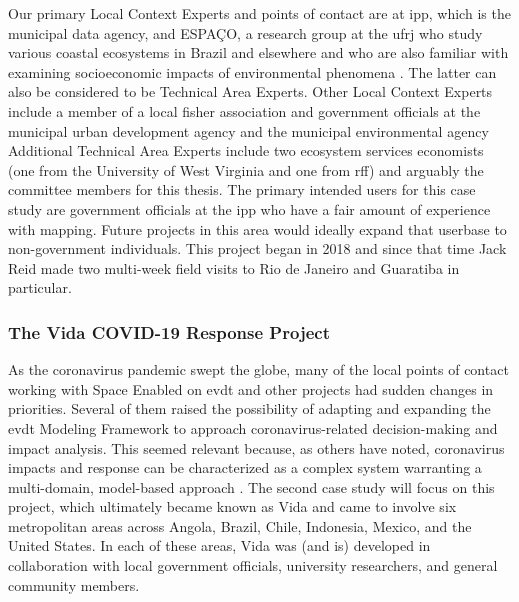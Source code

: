 \documentclass[notitlepage]{article}
\begin{document}
\color{OliveGreen} Our primary Local Context Experts and points of contact are at \ac{ipp}, which is the municipal data agency, and ESPAÇO, a research group at the \ac{ufrj} who study various coastal ecosystems in Brazil and elsewhere \cite{cruzClassificacaoOrientadaObjetos2007, seabraMapeamentoDinamicaCobertura2013} and who are also familiar with examining socioeconomic impacts of environmental phenomena \cite{schwenkResearchEnvironmentalSocioeconomical2008}. The latter can also be considered to be Technical Area Experts. Other Local Context Experts include a member of a local fisher association and government officials at the municipal urban development agency and the municipal environmental agency Additional Technical Area Experts include two ecosystem services economists (one from the University of West Virginia and one from \ac{rff}) and arguably the committee members for this thesis. The primary intended users for this case study are government officials at the \ac{ipp} who have a fair amount of experience with mapping. Future projects in this area would ideally expand that userbase to non-government individuals. \color{black}
This project began in 2018 and since that time Jack Reid made two multi-week field visits to Rio de Janeiro and Guaratiba in particular.


\subsubsection{The Vida COVID-19 Response Project}

As the coronavirus pandemic swept the globe, many of the local points of contact working with Space Enabled on \ac{evdt} and other projects had sudden changes in priorities. Several of them raised the possibility of adapting and expanding the \ac{evdt} Modeling Framework to approach coronavirus-related decision-making and impact analysis. This seemed relevant because, as others have noted, coronavirus impacts and response can be characterized as a complex system warranting a multi-domain, model-based approach \cite{deweckHandlingCOVID192020}. The second case study will focus on this project, which ultimately became known as Vida and came to involve six metropolitan areas across Angola, Brazil, Chile, Indonesia, Mexico, and the United States. In each of these areas, Vida was (and is) developed in collaboration with local government officials, university researchers, and general community members. 
\end{document}
